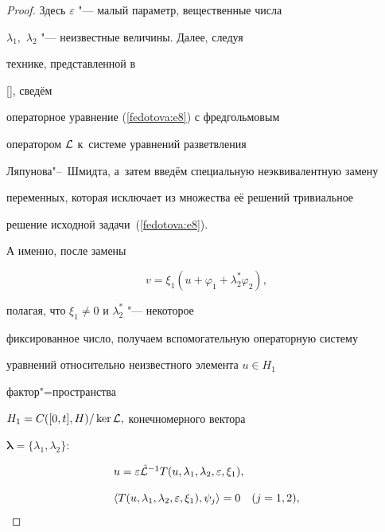 \begin{proof}
Здесь $\varepsilon$  "---  малый параметр, вещественные числа

$\lambda_1,$ $\lambda_2$  "---  неизвестные величины. Далее, следуя

технике, представленной в

[], сведём

операторное уравнение (\ref{fedotova:e8}) с фредгольмовым

оператором ${\cal L}$ к~системе уравнений разветвления

Ляпунова"--~Шмидта, а~затем введём специальную неэквивалентную замену

переменных, которая исключает из множества её решений тривиальное

решение исходной задачи~(\ref{fedotova:e8}).



А именно, после замены

\begin{equation}

\label{fedotova:e9} v=\xi_1(u+\varphi_1+\lambda_2^*\varphi_2),

\end{equation}

полагая, что $\xi_1\neq0$ и $\lambda_2^*$  "---  некоторое

фиксированное число, получаем вспомогательную операторную систему

уравнений относительно неизвестного элемента $u\in H_1$

фактор"=пространства \cite{fedotova:kolmg}

$H_1=C([0,t],H)/\ker{\cal L},$ конечномерного вектора

$\mathbf{\lambda}=\{\lambda_1, \lambda_2\}$:

\begin{equation}

\label{fedotova:e10}

\begin{array}{ll}

u=\varepsilon{\hat{{\cal

L}}}^{-1}T(u, \lambda_1, \lambda_2, \varepsilon, \xi_1),\\ \\

\langle

T(u, \lambda_1, \lambda_2, \varepsilon, \xi_1),\psi_j\rangle=0\quad

(j=1, 2),

\end{array}


\end{equation}
\end{proof}
